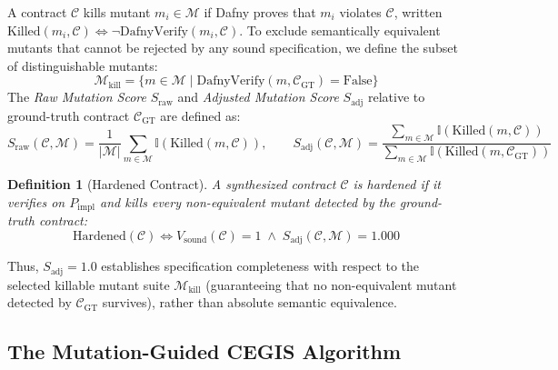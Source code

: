 \documentclass{article}
\newtheorem{definition}{Definition}
\begin{document}
A contract $\mathcal{C}$ kills mutant $m_i \in \mathcal{M}$ if Dafny proves that $m_i$ violates $\mathcal{C}$, written $\text{Killed}(m_i, \mathcal{C}) \iff \neg \text{DafnyVerify}(m_i, \mathcal{C})$. To exclude semantically equivalent mutants that cannot be rejected by any sound specification, we define the subset of distinguishable mutants:
\begin{equation}
\mathcal{M}_{\text{kill}} = \{m \in \mathcal{M} \mid \text{DafnyVerify}(m, \mathcal{C}_{\text{GT}}) = \text{False}\}
\end{equation}
The \textit{Raw Mutation Score} $S_{\text{raw}}$ and \textit{Adjusted Mutation Score} $S_{\text{adj}}$ relative to ground-truth contract $\mathcal{C}_{\text{GT}}$ are defined as:
\begin{equation}
S_{\text{raw}}(\mathcal{C}, \mathcal{M}) = \frac{1}{|\mathcal{M}|} \sum_{m \in \mathcal{M}} \mathbb{I}(\text{Killed}(m, \mathcal{C})), \qquad S_{\text{adj}}(\mathcal{C}, \mathcal{M}) = \frac{\sum_{m \in \mathcal{M}} \mathbb{I}(\text{Killed}(m, \mathcal{C}))}{\sum_{m \in \mathcal{M}} \mathbb{I}(\text{Killed}(m, \mathcal{C}_{\text{GT}}))}
\end{equation}

\begin{definition}[Hardened Contract]
A synthesized contract $\mathcal{C}$ is hardened if it verifies on $P_{\text{impl}}$ and kills every non-equivalent mutant detected by the ground-truth contract:
\begin{equation}
\text{Hardened}(\mathcal{C}) \iff V_{\text{sound}}(\mathcal{C}) = 1 \;\land\; S_{\text{adj}}(\mathcal{C}, \mathcal{M}) = 1.000
\end{equation}
\end{definition}
Thus, $S_{\text{adj}}=1.0$ establishes specification completeness with respect to the selected killable mutant suite $\mathcal{M}_{\text{kill}}$ (guaranteeing that no non-equivalent mutant detected by $\mathcal{C}_{\text{GT}}$ survives), rather than absolute semantic equivalence.

\subsection{The Mutation-Guided CEGIS Algorithm}
\label{sec:algorithm}
\end{document}
